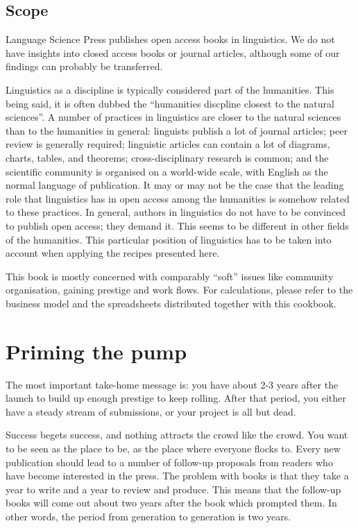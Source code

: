 \documentclass[nonflat,smallfont
]{langsci/langscibook}
\begin{document}
\section{Scope}
Language Science Press publishes open access books in linguistics. We do not have insights into closed access books or journal articles, although some of our findings can probably be transferred. 

Linguistics as a discipline is typically considered part of the humanities. This being said, it is often dubbed the ``humanities discpline closest to the natural sciences''. A number of practices in linguistics are closer to the natural sciences than to the humanities in general: 
linguists publish a lot of journal articles; 
peer review is generally required; 
linguistic articles can contain a lot of diagrams, charts, tables, and theorems; 
cross-disciplinary research is common; 
and the scientific community is organised on a world-wide scale, with English as the normal language of publication.
It may or may not be the case that the leading role that linguistics has in open access among the humanities is somehow related to these practices. In general, authors in linguistics do not have to be convinced to publish open access; they demand it. This seems to be different in other fields of the humanities. This particular position of linguistics has to be taken into account when applying the recipes presented here. 

This book is mostly concerned with comparably ``soft'' issues like community organisation, gaining prestige and work flows. For calculations, please refer to the business model and the spreadsheets distributed together with this cookbook. 


\chapter{Priming the pump}

The most important take-home message is: you have about 2-3 years after the launch to build up enough prestige to keep rolling. 
After that period, you either have a steady stream of submissions, or your project is all but dead. 

Success begets success, and nothing attracts the crowd like the crowd. You want to be seen as the place to be, as the place where everyone  flocks to. Every new publication should lead to a number of follow-up proposals from readers who have become interested in the press. The problem with books is that they take a year to write and a year to review and produce. This means that the follow-up books will come out about two years after the book which prompted them. In other words, the period from generation to generation is two years. 
\end{document}
